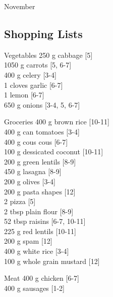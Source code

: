 \begin{menu}{November}
    \subsection*{Shopping Lists}
      \begin{shoppinglist}{Vegetables}
      250 g cabbage {\scriptsize[5]}\\
      1050 g carrots {\scriptsize[5, 6-7]}\\
      400 g celery {\scriptsize[3-4]}\\
      1 cloves garlic {\scriptsize[6-7]}\\
      1  lemon {\scriptsize[6-7]}\\
      650 g onions {\scriptsize[3-4, 5, 6-7]}\\
      \end{shoppinglist}%
      \begin{shoppinglist}{Groceries}
      400 g brown rice {\scriptsize[10-11]}\\
      400 g can tomatoes {\scriptsize[3-4]}\\
      400 g cous cous {\scriptsize[6-7]}\\
      100 g dessicated coconut {\scriptsize[10-11]}\\
      200 g green lentils {\scriptsize[8-9]}\\
      450 g lasagna {\scriptsize[8-9]}\\
      200 g olives {\scriptsize[3-4]}\\
      200 g pasta shapes {\scriptsize[12]}\\
      2  pizza {\scriptsize[5]}\\
      2 tbsp plain flour {\scriptsize[8-9]}\\
      52 tbsp raisins {\scriptsize[6-7, 10-11]}\\
      225 g red lentils {\scriptsize[10-11]}\\
      200 g spam {\scriptsize[12]}\\
      400 g white rice {\scriptsize[3-4]}\\
      100 g whole grain mustard {\scriptsize[12]}\\
      \end{shoppinglist}%
      \par\vfil %
      \begin{shoppinglist}{Meat}
      400 g chicken {\scriptsize[6-7]}\\
      400 g sausages {\scriptsize[1-2]}\\

\end{shoppinglist}
\end{menu}
